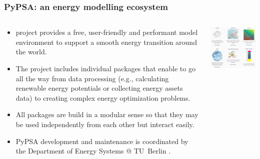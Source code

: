 \begin{frame}
  \frametitle{PyPSA: an energy modelling ecosystem}

\begin{columns}[T]
\begin{column}{7cm}

{\footnotesize
  \begin{itemize}
  \item {} project provides a free, user-friendly and performant model environment to support a smooth energy transition around the world. 
  \item The project includes individual packages that enable to go all the way from data processing (e.g., calculating renewable energy potentials or collecting energy assets data) to creating complex energy optimization problems. 
  \item All packages are build in a modular sense so that they may be used independently from each other but interact easily.
  \item PyPSA development and maintenance is coordinated by the Department of Energy Systems @ TU~Berlin .  
  \end{itemize}
}
\end{column}
\begin{column}{9cm}

\centering
\includegraphics[width=8.5cm]{images/pypsa-web.png}

\end{column}
\end{columns}

\end{frame}



